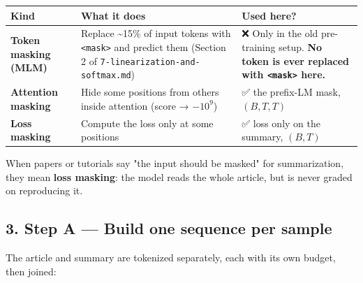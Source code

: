 \documentclass[11pt,a4paper,oneside]{report}
\begin{document}
{\def\LTcaptype{none} %
\begin{longtable}[]{@{}>{\raggedright\arraybackslash}p{}>{\raggedright\arraybackslash}p{}>{\raggedright\arraybackslash}p{}@{}}
\toprule\noalign{}
Kind & What it does & Used here? \\
\midrule\noalign{}
\endhead
\bottomrule\noalign{}
\endlastfoot
\textbf{Token masking (MLM)} & Replace \textasciitilde15\% of input tokens with \texttt{\textless{}mask\textgreater{}} and predict them (Section 2 of \texttt{7-linearization-and-softmax.\allowbreak{}md}) & ❌ Only in the old pre-training setup. \textbf{No token is ever replaced with \texttt{\textless{}mask\textgreater{}} here.} \\
\textbf{Attention masking} & Hide some positions from others inside attention (score → \(-10^9\)) & ✅ the prefix-LM mask, \((B,\allowbreak T,\allowbreak T)\) \\
\textbf{Loss masking} & Compute the loss only at some positions & ✅ loss only on the summary, \((B,\allowbreak T)\) \\
\end{longtable}
}

When papers or tutorials say "the input should be masked" for summarization, they mean \textbf{loss masking}: the model reads the whole article, but is never graded on reproducing it.

\subsection{3. Step A --- Build one sequence per sample}\label{3-step-a--build-one-sequence-per-sample}

The article and summary are tokenized separately, each with its own budget, then joined:

\begin{center}\end{center}
\end{document}
